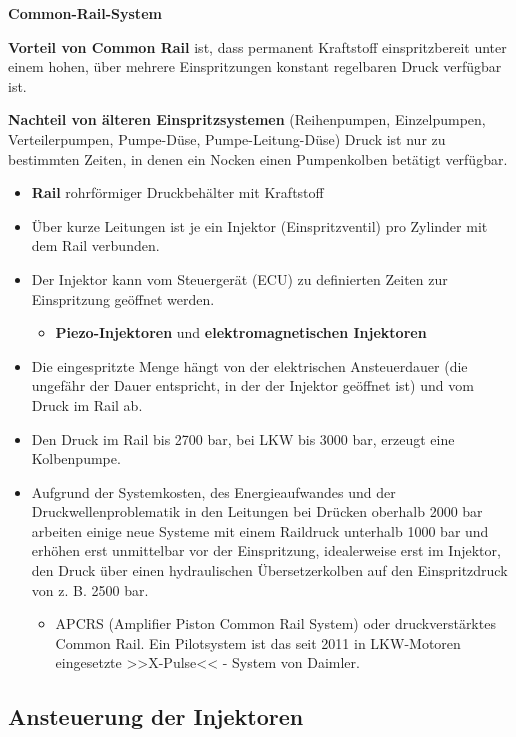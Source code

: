 \textbf{Common-Rail-System}

\textbf{Vorteil von Common Rail} ist, dass permanent Kraftstoff
einspritzbereit unter einem hohen, über mehrere Einspritzungen konstant
regelbaren Druck verfügbar ist.

\textbf{Nachteil von älteren Einspritzsystemen} (Reihenpumpen,
Einzelpumpen, Verteilerpumpen, Pumpe-Düse, Pumpe-Leitung-Düse) Druck ist
nur zu bestimmten Zeiten, in denen ein Nocken einen Pumpenkolben
betätigt verfügbar.

\begin{itemize}
\item
  \textbf{Rail} rohrförmiger Druckbehälter mit Kraftstoff
\item
  Über kurze Leitungen ist je ein Injektor (Einspritzventil) pro
  Zylinder mit dem Rail verbunden.
\item
  Der Injektor kann vom Steuergerät (ECU) zu definierten Zeiten zur
  Einspritzung geöffnet werden.

  \begin{itemize}
  \item
    \textbf{Piezo-Injektoren} und \textbf{elektromagnetischen
    Injektoren}
  \end{itemize}
\item
  Die eingespritzte Menge hängt von der elektrischen Ansteuerdauer (die
  ungefähr der Dauer entspricht, in der der Injektor geöffnet ist) und
  vom Druck im Rail ab.
\item
  Den Druck im Rail bis 2700 bar, bei LKW bis 3000 bar, erzeugt eine
  Kolbenpumpe.
\item
  Aufgrund der Systemkosten, des Energieaufwandes und der
  Druckwellenproblematik in den Leitungen bei Drücken oberhalb 2000 bar
  arbeiten einige neue Systeme mit einem Raildruck unterhalb 1000 bar
  und erhöhen erst unmittelbar vor der Einspritzung, idealerweise erst
  im Injektor, den Druck über einen hydraulischen Übersetzerkolben auf
  den Einspritzdruck von z. B. 2500 bar.

  \begin{itemize}
  \item
    APCRS (Amplifier Piston Common Rail System) oder druckverstärktes
    Common Rail. Ein Pilotsystem ist das seit 2011 in LKW-Motoren
    eingesetzte >>X-Pulse<< - System von Daimler.
  \end{itemize}
\end{itemize}

\newpage

\subsection{Ansteuerung der
Injektoren}\label{ansteuerung-der-injektoren}

